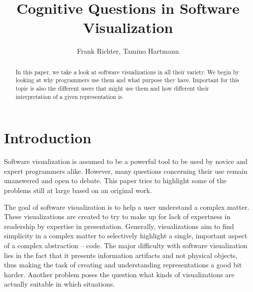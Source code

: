 \documentclass[11pt, a4paper, ngerman, twoside]{article}
\date{}
\theoremstyle{plain}\newtheorem{Lemma}{Lemma}
\theoremstyle{plain}\newtheorem{Satz}[Lemma]{Satz}
\theoremstyle{definition}\newtheorem{Definition}[Lemma]{Definition}
\theoremstyle{definition}\newtheorem*{Beispiel}{Beispiel}
\theoremstyle{remark}\newtheorem*{Bemerkung}{Bemerkung}
\begin{document}
\title{Cognitive Questions in Software Visualization}
\author{Frank Richter, Tamino Hartmann}

\makeatletter
\let\mytitle\@title
\let\myauthor\@author
\makeatother
\maketitle
\begin{abstract}

In this paper, we take a look at software visualizations in all their variety. We begin by looking at why programmers use them and what purpose they have. Important for this topic is also the different users that might use them and how different their interpretation of a given representation is.

\end{abstract}

\section{Introduction}

Software visualization is assumed to be a powerful tool to be used by novice and expert programmers alike. However, many questions concerning their use remain unanswered and open to debate. This paper tries to highlight some of the problems still at large based on an original work\cite{origin}.

The goal of software visualization is to help a user understand a complex matter. These visualizations are created to try to make up for lack of expertness in readership by expertise in presentation. Generally, visualizations aim to find simplicity in a complex matter to selectively highlight a single, important aspect of a complex abstraction – code. The major difficulty with software visualization lies in the fact that it presents information artifacts and not physical objects, thus making the task of creating and understanding representations a good bit harder. Another problem poses the question what kinds of visualizations are actually suitable in which situations.
\end{document}
